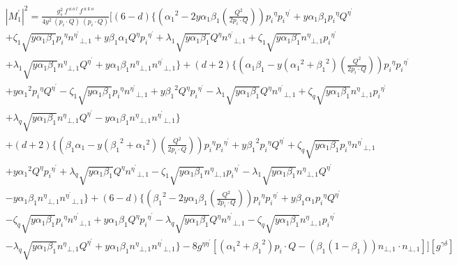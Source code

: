 \begin{equation}
\begin{split}
&{|{M}^{\prime}_1|}^2 =\frac{g_s^2 \:f^{\:a\:o\:l}\: f^{\:a\:k\:o}}{4y^2\:(p_i\cdot Q) \:(p_i\cdot Q)}[(6-d)\lbrace({\alpha_1}^2 -2y\alpha_1 \beta_1(\frac{Q^2}{2p_i \cdot Q})) {p_i}^{\eta}{p_i}^{{\eta}^{\prime}}+y\alpha_1\beta_1 {p_i}^{\eta}{Q}^{{\eta}^{\prime}}\\
&+\zeta_1\sqrt{y\alpha_1\beta_1}{p_i}^{\eta}{n^{{\eta}^{\prime}}}_{\bot,1}+y\beta_1\alpha_1  {Q}^{\eta}{p_i}^{{\eta}^{\prime}}+\lambda_1\sqrt{y\alpha_1\beta_1}{Q}^{\eta}{n^{{\eta}^{\prime}}}_{\bot,1}
+\zeta_1\sqrt{y\alpha_1\beta_1} {n^{{\eta}}}_{\bot,1}{p_i}^{{\eta}^{\prime}}\\
&+\lambda_1\sqrt{y\alpha_1\beta_1}{n^{{\eta}}}_{\bot,1}{Q}^{{\eta}^{\prime}}+y\alpha_1\beta_1{n^{{\eta}}}_{\bot,1}{n^{{\eta}^{\prime}}}_{\bot,1}\rbrace
+(d+2)\lbrace(\alpha_1\beta_1-y({\alpha_1}^2+{\beta_1}^2) (\frac{Q^2}{2p_i \cdot Q})) {p_i}^{\eta}{p_i}^{{\eta}^{\prime}}\\
&+y{\alpha_1}^2{p_i}^{\eta}{Q}^{{\eta}^{\prime}}-\zeta_1\sqrt{y\alpha_1\beta_1}{p_i}^{\eta}{n^{{\eta}^{\prime}}}_{\bot,1}+y{\beta_1}^2 {Q}^{\eta}{p_i}^{{\eta}^{\prime}}-\lambda_1\sqrt{y\alpha_1\beta_1}{Q}^{\eta}{n^{{\eta}^{\prime}}}_{\bot,1}
+\zeta_q\sqrt{y\alpha_1\beta_1} {n^{{\eta}}}_{\bot,1}{p_i}^{{\eta}^{\prime}}\\
&+\lambda_q\sqrt{y\alpha_1\beta_1}{n^{{\eta}}}_{\bot,1}{Q}^{{\eta}^{\prime}}-y\alpha_1\beta_1{n^{{\eta}}}_{\bot,1}{n^{{\eta}^{\prime}}}_{\bot,1}\rbrace\\
&+(d+2)\lbrace(\beta_1\alpha_1-y({\beta_1}^2+{\alpha_1}^2)(\frac{Q^2}{2p_i \cdot Q})) {p_i}^{\eta}{p_i}^{{\eta}^{\prime}}+y{\beta_1}^2{p_i}^{\eta}{Q}^{{\eta}^{\prime}}+\zeta_q\sqrt{y\alpha_1\beta_1}{p_i}^{\eta}{n^{{\eta}^{\prime}}}_{\bot,1}\\
&+y{\alpha_1}^2 {Q}^{\eta}{p_i}^{{\eta}^{\prime}}+\lambda_q\sqrt{y\alpha_1\beta_1}{Q}^{\eta}{n^{{\eta}^{\prime}}}_{\bot,1}-\zeta_1\sqrt{y\alpha_1\beta_1} {n^{{\eta}}}_{\bot,1}{p_i}^{{\eta}^{\prime}}-\lambda_1\sqrt{y\alpha_1\beta_1}{n^{{\eta}}}_{\bot,1}{Q}^{{\eta}^{\prime}}\\
&-y\alpha_1\beta_1{n^{{\eta}}}_{\bot,1}{n^{{\eta}^{\prime}}}_{\bot,1}\rbrace
+(6-d)\lbrace({\beta_1}^2 -2y\alpha_1\beta_1 (\frac{Q^2}{2p_i \cdot Q})) {p_i}^{\eta}{p_i}^{{\eta}^{\prime}}+y\beta_1\alpha_1 {p_i}^{\eta}{Q}^{{\eta}^{\prime}}\\
&-\zeta_q\sqrt{y\alpha_1\beta_1}{p_i}^{\eta}{n^{{\eta}^{\prime}}}_{\bot,1}
+y\alpha_1\beta_1 {Q}^{\eta}{p_i}^{{\eta}^{\prime}}-\lambda_q\sqrt{y\alpha_1\beta_1}{Q}^{\eta}{n^{{\eta}^{\prime}}}_{\bot,1}-\zeta_q\sqrt{y\alpha_1\beta_1} {n^{{\eta}}}_{\bot,1}{p_i}^{{\eta}^{\prime}}\\
&-\lambda_q\sqrt{y\alpha_1\beta_1}{n^{{\eta}}}_{\bot,1}{Q}^{{\eta}^{\prime}}+y\alpha_1\beta_1{n^{{\eta}}}_{\bot,1}{n^{{\eta}^{\prime}}}_{\bot,1}\rbrace-8g^{{\eta}{{\eta}^{\prime}}}[({\alpha_1}^2+{\beta_1}^2) p_i \cdot Q - ({\beta_1}(1-\beta_1)){n}_{\bot,1}\cdot{n}_{\bot,1}]][g^{{\gamma}{{\delta}}}]
\end{split}
\end{equation}


